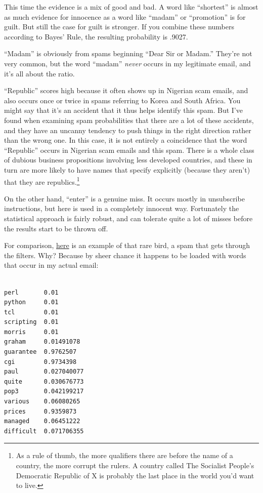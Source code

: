 \documentclass[12pt]{book}
\begin{document}
This time the evidence is a mix of good and bad. A word like
``shortest'' is almost as much evidence for innocence as a word like
``madam'' or ``promotion'' is for guilt. But still the case for guilt is
stronger. If you combine these numbers according to Bayes' Rule, the
resulting probability is .9027.

``Madam'' is obviously from spams beginning ``Dear Sir or Madam.''
They're not very common, but the word ``madam'' \emph{never} occurs in
my legitimate email, and it's all about the ratio.

``Republic'' scores high because it often shows up in Nigerian scam
emails, and also occurs once or twice in spams referring to Korea and
South Africa. You might say that it's an accident that it thus helps
identify this spam. But I've found when examining spam probabilities
that there are a lot of these accidents, and they have an uncanny
tendency to push things in the right direction rather than the wrong
one. In this case, it is not entirely a coincidence that the word
``Republic'' occurs in Nigerian scam emails and this spam. There is a
whole class of dubious business propositions involving less developed
countries, and these in turn are more likely to have names that specify
explicitly (because they aren't) that they are republics.\footnote{As a rule of thumb, the more qualifiers there are before the
name of a country, the more corrupt the rulers. A country called The
Socialist People's Democratic Republic of X is probably the last place
in the world you'd want to live.}

On the other hand, ``enter'' is a genuine miss. It occurs mostly in
unsubscribe instructions, but here is used in a completely innocent way.
Fortunately the statistical approach is fairly robust, and can tolerate
quite a lot of misses before the results start to be thrown off.

For comparison,
\href{https://sep.turbifycdn.com/ty/cdn/paulgraham/hostexspam.txt?t=1688221954&}{here}
is an example of that rare bird, a spam that gets through the filters.
Why? Because by sheer chance it happens to be loaded with words that
occur in my actual email:

\begin{verbatim}

perl       0.01
python     0.01
tcl        0.01
scripting  0.01
morris     0.01
graham     0.01491078
guarantee  0.9762507
cgi        0.9734398
paul       0.027040077
quite      0.030676773
pop3       0.042199217
various    0.06080265
prices     0.9359873
managed    0.06451222
difficult  0.071706355
\end{verbatim}
\end{document}
